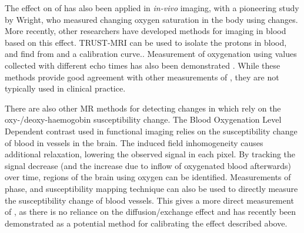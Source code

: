 The effect on \Ttwo of \SOtwo has also been applied in \textit{in-vivo} imaging, with a pioneering study by Wright\cite{WrightEstimatingoxygensaturation1991}, who measured changing oxygen saturation in the body using \Ttwo changes.
More recently, other researchers have developed methods for imaging \SOtwo in blood based on this \Ttwo effect\cite{RodgersMRIbasedmethodsquantification2016}.
TRUST-MRI can be used to isolate the protons in blood, and find \SOtwo from \Ttwo and a calibration curve.\cite{LuQuantitativeevaluationoxygenation2008}.
Measurement of oxygenation using \Ttwo values collected with different echo times has also been demonstrated \cite{VargheseCMRbasedbloodoximetry2017}.
While these methods provide good agreement with other measurements of \SOtwo, they are not typically used in clinical practice.

There are also other MR methods for detecting changes in \SOtwo which rely on the oxy-/deoxy-haemogobin susceptibility change.
The Blood Oxygenation Level Dependent contrast used in functional imaging relies on the susceptibility change of blood in vessels in the brain.
The induced field inhomogeneity causes additional \Ttwostar relaxation, lowering the observed signal in each pixel.
By tracking the signal decrease (and the increase due to inflow of oxygenated blood afterwards) over time, regions of the brain using oxygen can be identified.
Measurements of phase, and susceptibility mapping technique can also be used to directly measure the susceptibility change of blood vessels\cite{Haackevivomeasurementblood1997,Fernandez-SearaMRsusceptometrymeasuring2006a,JainInvestigatingmagneticsusceptibility2012}.
This gives a more direct measurement of \SOtwo, as there is no reliance on the diffusion/exchange effect and has recently been demonstrated as a potential method for calibrating the \Ttwo effect described above.\cite{LanghamvivowholebloodT22018}

